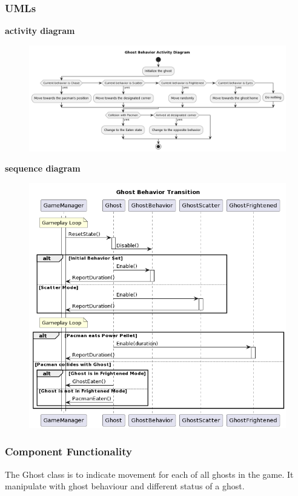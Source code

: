 \documentclass[11pt]{article}
\begin{document}
\subsubsection{UMLs}
\textbf{activity diagram}\\
\begin{figure}[H]
    \centering
    \includegraphics*[scale=0.3]{Ghost_Activity.png}
\end{figure}
\textbf{sequence diagram}\\
\begin{figure}[H]
    \centering
    \includegraphics*[scale=0.4]{Ghost_Sequence.png}
\end{figure}
\subsubsection{Component Functionality}
The Ghost class is to indicate movement for each of all ghosts in the game. It manipulate with ghost behaviour and different status of a ghost.
\end{document}

